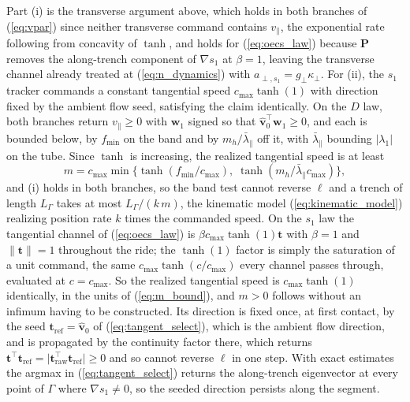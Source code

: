 \documentclass[lettersize,journal]{IEEEtran}
\begin{document}
\begin{IEEEproof}
Part (i) is the transverse argument above, which holds in both branches
of (\ref{eq:vpar}) since neither transverse command contains $v_\parallel$, the
exponential rate following from concavity of $\tanh$, and holds for
(\ref{eq:oecs_law}) because $\mathbf{P}$ removes the along-trench
component of $\nabla s_1$ at $\beta = 1$, leaving the transverse channel
already treated at (\ref{eq:n_dynamics}) with $a_{\perp,s_1} =
g_\perp\kappa_\perp$. For (ii), the $s_1$ tracker commands a constant tangential speed $c_{\max}\tanh(1)$ with direction fixed by the ambient flow seed, satisfying the claim identically. On the $D$ law, both
branches return $v_\parallel \geq 0$ with $\mathbf{w}_1$ signed so that
$\hat{\mathbf{v}}_0^\top\mathbf{w}_1 \geq 0$, and each is bounded below,
by $f_{\min}$ on the band and by $m_h/\bar{\lambda}_\parallel$ off it,
with $\bar{\lambda}_\parallel$ bounding $|\lambda_1|$ on the tube. Since
$\tanh$ is increasing, the realized tangential speed is at least
\begin{equation}
    m = c_{\max}\min\bigl\{\tanh(f_{\min}/c_{\max}),\;
    \tanh(m_h/\bar{\lambda}_\parallel c_{\max})\bigr\},
    \label{eq:m_bound}
\end{equation}
and (i) holds in both branches, so the band test cannot reverse $\ell$
and a trench of length $L_\Gamma$ takes at most $L_\Gamma/(k\,m)$, the kinematic model (\ref{eq:kinematic_model}) realizing position rate $k$ times the commanded speed. On the
$s_1$ law the tangential channel of (\ref{eq:oecs_law}) is
$\beta c_{\max}\tanh(1)\mathbf{t}$ with $\beta = 1$ and
$\lVert\mathbf{t}\rVert = 1$ throughout the ride; the $\tanh(1)$ factor
is simply the saturation of a unit command, the same
$c_{\max}\tanh(c/c_{\max})$ every channel passes through, evaluated at
$c = c_{\max}$. So the realized
tangential speed is $c_{\max}\tanh(1)$ identically, in the units of
(\ref{eq:m_bound}), and $m > 0$ follows without an infimum having to be
constructed. Its direction is fixed once, at first contact, by the seed
$\mathbf{t}_{\mathrm{ref}} = \hat{\mathbf{v}}_0$ of
(\ref{eq:tangent_select}), which is the ambient flow direction, and is
propagated by the continuity factor there, which returns
$\mathbf{t}^\top\mathbf{t}_{\mathrm{ref}} =
\lvert\mathbf{t}_{\mathrm{raw}}^\top\mathbf{t}_{\mathrm{ref}}\rvert
\geq 0$ and so cannot reverse $\ell$ in one step. With exact estimates
the argmax in (\ref{eq:tangent_select}) returns the along-trench
eigenvector at every point of $\Gamma$ where $\nabla s_1 \neq 0$, so the
seeded direction persists along the segment.
\end{IEEEproof}
\end{document}
